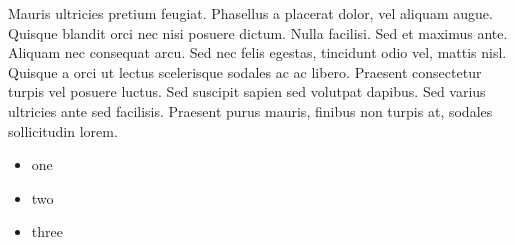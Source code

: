 Mauris ultricies pretium feugiat. Phasellus a placerat dolor, vel aliquam augue. Quisque blandit orci nec nisi posuere dictum. Nulla facilisi. Sed et maximus ante. Aliquam nec consequat arcu. Sed nec felis egestas, tincidunt odio vel, mattis nisl. Quisque a orci ut lectus scelerisque sodales ac ac libero. Praesent consectetur turpis vel posuere luctus. Sed suscipit sapien sed volutpat dapibus. Sed varius ultricies ante sed facilisis. Praesent purus mauris, finibus non turpis at, sodales sollicitudin lorem. 

\begin{itemize}
\item one
\item two
\item three
\end{itemize}